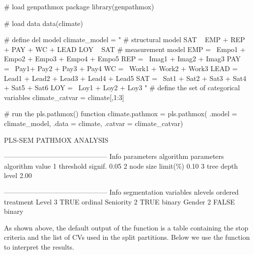 \begin{example}
# load genpathmox package
library(genpathmox)

# load data
data(climate)

# define del model  
climate_model  =  "
	# structural model 
	SAT ~ EMP + REP + PAY + WC + LEAD
	LOY ~   SAT
	# measurement model
	EMP =~ Empo1 + Empo2 + Empo3 + Empo4 + Empo5 
	REP  =~ Imag1 + Imag2 + Imag3     
	PAY  =~ Pay1+ Pay2 + Pay3 + Pay4
	WC =~ Work1 + Work2 + Work3
	LEAD =~ Lead1 + Lead2 + Lead3 + Lead4 + Lead5
	SAT =~ Sat1 + Sat2 + Sat3 + Sat4 + Sat5 + Sat6
	LOY =~ Loy1 + Loy2 + Loy3
	"
# define the set of categorical variables
climate_catvar = climate[,1:3]

# run the pls.pathmox() function
climate.pathmox = pls.pathmox(
	.model = climate_model,
	.data = climate,
	.catvar = climate_catvar)

PLS-SEM PATHMOX ANALYSIS 

---------------------------------------------
Info parameters algorithm 
  parameters algorithm value
1    threshold signif.  0.05
2   node size limit(\%) 0.10
3     tree depth level  2.00

---------------------------------------------
Info segmentation variables 
          nlevels ordered treatment
Level           3    TRUE   ordinal
Seniority       2    TRUE    binary
Gender          2   FALSE    binary

\end{example}

As shown above, the default output of the   function is a  table containing the stop criteria and the  list of CVs used in the split partitions. Below we use the   function to interpret the results.

